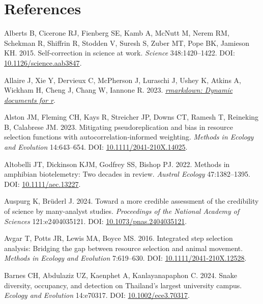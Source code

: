\documentclass[10pt,a4paper]{article}
\newlength{\cslhangindent}
\newenvironment{CSLReferences}[2] %
 {\begin{list}{}{%
  \setlength{\itemindent}{0pt}
  \setlength{\leftmargin}{0pt}
  \setlength{\parsep}{0pt}
  \ifodd #1
   \setlength{\leftmargin}{\cslhangindent}
   \setlength{\itemindent}{-1\cslhangindent}
  \fi
  \setlength{\itemsep}{#2\baselineskip}}}
 {\end{list}}
\begin{document}
\clearpage

\section*{References}\label{references}

\label{refs}
\begin{CSLReferences}{1}{0}
Alberts B, Cicerone RJ, Fienberg SE, Kamb A, McNutt M, Nerem RM, Schekman R, Shiffrin R, Stodden V, Suresh S, Zuber MT, Pope BK, Jamieson KH. 2015. Self-correction in science at work. \emph{Science} 348:1420--1422. DOI: \href{https://doi.org/10.1126/science.aab3847}{10.1126/science.aab3847}.

Allaire J, Xie Y, Dervieux C, McPherson J, Luraschi J, Ushey K, Atkins A, Wickham H, Cheng J, Chang W, Iannone R. 2023. \emph{\href{https://github.com/rstudio/rmarkdown}{{rmarkdown}: Dynamic documents for r}}.

Alston JM, Fleming CH, Kays R, Streicher JP, Downs CT, Ramesh T, Reineking B, Calabrese JM. 2023. Mitigating pseudoreplication and bias in resource selection functions with autocorrelation‐informed weighting. \emph{Methods in Ecology and Evolution} 14:643--654. DOI: \href{https://doi.org/10.1111/2041-210X.14025}{10.1111/2041-210X.14025}.

Altobelli JT, Dickinson KJM, Godfrey SS, Bishop PJ. 2022. Methods in amphibian biotelemetry: {Two} decades in review. \emph{Austral Ecology} 47:1382--1395. DOI: \href{https://doi.org/10.1111/aec.13227}{10.1111/aec.13227}.

Auspurg K, Brüderl J. 2024. Toward a more credible assessment of the credibility of science by many-analyst studies. \emph{Proceedings of the National Academy of Sciences} 121:e2404035121. DOI: \href{https://doi.org/10.1073/pnas.2404035121}{10.1073/pnas.2404035121}.

Avgar T, Potts JR, Lewis MA, Boyce MS. 2016. Integrated step selection analysis: Bridging the gap between resource selection and animal movement. \emph{Methods in Ecology and Evolution} 7:619--630. DOI: \href{https://doi.org/10.1111/2041-210X.12528}{10.1111/2041-210X.12528}.

Barnes CH, Abdulaziz UZ, Kaenphet A, Kanlayanapaphon C. 2024. Snake diversity, occupancy, and detection on {Thailand}'s largest university campus. \emph{Ecology and Evolution} 14:e70317. DOI: \href{https://doi.org/10.1002/ece3.70317}{10.1002/ece3.70317}.


\end{CSLReferences}
\end{document}
